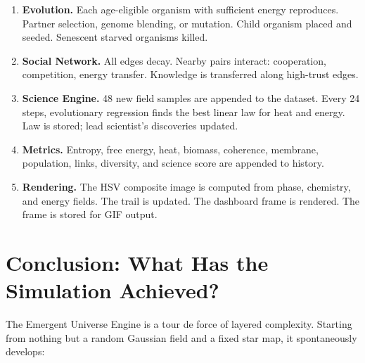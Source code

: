 \documentclass[12pt,a4paper]{article}
\begin{document}
\begin{enumerate}
\item \textbf{Evolution.}
  Each age-eligible organism with sufficient energy reproduces.
  Partner selection, genome blending, or mutation.
  Child organism placed and seeded.
  Senescent starved organisms killed.

\item \textbf{Social Network.}
  All edges decay.
  Nearby pairs interact: cooperation, competition, energy transfer.
  Knowledge is transferred along high-trust edges.

\item \textbf{Science Engine.}
  48 new field samples are appended to the dataset.
  Every 24 steps, evolutionary regression finds the best
  linear law for heat and energy.
  Law is stored; lead scientist's discoveries updated.

\item \textbf{Metrics.}
  Entropy, free energy, heat, biomass, coherence, membrane,
  population, links, diversity, and science score are
  appended to history.

\item \textbf{Rendering.}
  The HSV composite image is computed from phase, chemistry,
  and energy fields.
  The trail is updated.
  The dashboard frame is rendered.
  The frame is stored for GIF output.

\end{enumerate}

\section{Conclusion: What Has the Simulation Achieved?}

The Emergent Universe Engine is a tour de force of
layered complexity.
Starting from nothing but a random Gaussian field and a fixed
star map, it spontaneously develops:
\end{document}

